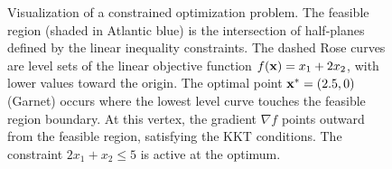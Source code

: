 \begin{figure}[htbp]
\caption{Visualization of a constrained optimization problem. The feasible region (shaded in Atlantic blue) is the intersection of half-planes defined by the linear inequality constraints. The dashed Rose curves are level sets of the linear objective function $f(\mathbf{x}) = x_1 + 2x_2$, with lower values toward the origin. The optimal point $\mathbf{x}^* = (2.5, 0)$ (Garnet) occurs where the lowest level curve touches the feasible region boundary. At this vertex, the gradient $\nabla f$ points outward from the feasible region, satisfying the KKT conditions. The constraint $2x_1 + x_2 \leq 5$ is active at the optimum.}
\label{fig:constraint_visualization}
\end{figure}

